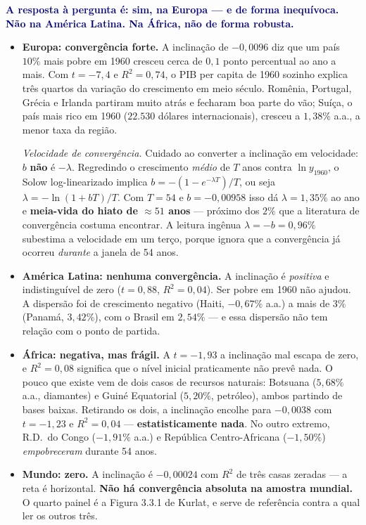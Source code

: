 \documentclass[11pt, a4paper]{article}
\newcommand{\resp}[1]{\textcolor{darkblue}{\textbf{#1}}}
\begin{document}
\resp{A resposta à pergunta é: sim, na Europa --- e de forma inequívoca. Não na América
Latina. Na África, não de forma robusta.}

\begin{itemize}
\item \textbf{Europa: convergência forte.} A inclinação de $-0{,}0096$ diz que um país
      $10\%$ mais pobre em 1960 cresceu cerca de $0{,}1$ ponto percentual ao ano a mais.
      Com $t = -7{,}4$ e $R^2 = 0{,}74$, o PIB per capita de 1960 sozinho explica três
      quartos da variação do crescimento em meio século. Romênia, Portugal, Grécia e
      Irlanda partiram muito atrás e fecharam boa parte do vão; Suíça, o país mais rico em
      1960 ($22{.}530$ dólares internacionais), cresceu a $1{,}38\%$ a.a., a menor taxa da
      região.

      \emph{Velocidade de convergência.} Cuidado ao converter a inclinação em velocidade:
      $b$ \textbf{não} é $-\lambda$. Regredindo o crescimento \emph{médio} de $T$ anos
      contra $\ln y_{1960}$, o Solow log-linearizado implica
      $b = -\left(1 - e^{-\lambda T}\right)/T$, ou seja
      $\lambda = -\ln(1 + bT)/T$. Com $T = 54$ e $b = -0{,}00958$ isso dá
      $\lambda = 1{,}35\%$ ao ano e \textbf{meia-vida do hiato de $\approx 51$ anos} ---
      próximo dos $2\%$ que a literatura de convergência costuma encontrar. A leitura
      ingênua $\lambda = -b = 0{,}96\%$ subestima a velocidade em um terço, porque ignora
      que a convergência já ocorreu \emph{durante} a janela de 54 anos.
\item \textbf{América Latina: nenhuma convergência.} A inclinação é \emph{positiva} e
      indistinguível de zero ($t = 0{,}88$, $R^2 = 0{,}04$). Ser pobre em 1960 não ajudou.
      A dispersão foi de crescimento negativo (Haiti, $-0{,}67\%$ a.a.) a mais de $3\%$
      (Panamá, $3{,}42\%$), com o Brasil em $2{,}54\%$ --- e essa dispersão não tem relação
      com o ponto de partida.
\item \textbf{África: negativa, mas frágil.} A $t = -1{,}93$ a inclinação mal escapa de
      zero, e $R^2 = 0{,}08$ significa que o nível inicial praticamente não prevê nada. O
      pouco que existe vem de dois casos de recursos naturais: Botsuana ($5{,}68\%$ a.a.,
      diamantes) e Guiné Equatorial ($5{,}20\%$, petróleo), ambos partindo de bases
      baixas. Retirando os dois, a inclinação encolhe para $-0{,}0038$ com $t = -1{,}23$ e
      $R^2 = 0{,}04$ --- \textbf{estatisticamente nada}. No outro extremo, R.D.\ do Congo
      ($-1{,}91\%$ a.a.) e República Centro-Africana ($-1{,}50\%$) \emph{empobreceram}
      durante 54 anos.
\item \textbf{Mundo: zero.} A inclinação é $-0{,}00024$ com $R^2$ de três casas
      zeradas --- a reta é horizontal. \textbf{Não há convergência absoluta na amostra
      mundial.} O quarto painel é a Figura 3.3.1 de Kurlat, e serve de referência contra a
      qual ler os outros três.
\end{itemize}
\end{document}

